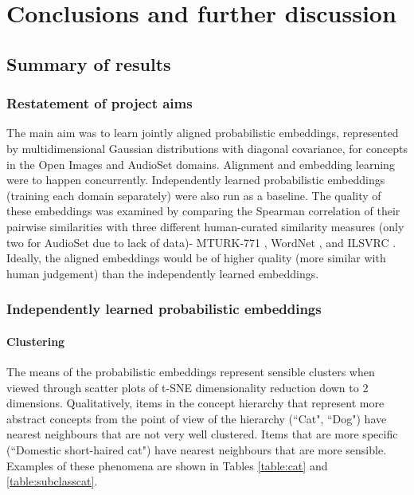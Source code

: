 \chapter{Conclusions and further discussion}

\section{Summary of results}

\subsection{Restatement of project aims}

The main aim was to learn jointly aligned probabilistic embeddings, represented by multidimensional Gaussian distributions with diagonal covariance, for concepts in the Open Images and AudioSet domains. Alignment and embedding learning were to happen concurrently. Independently learned probabilistic embeddings (training each domain separately) were also run as a baseline. The quality of these embeddings was examined by comparing the Spearman correlation of their pairwise similarities with three different human-curated similarity measures (only two for AudioSet due to lack of data)- MTURK-771 \cite{mturk771}, WordNet \cite{WordNet}, and ILSVRC \cite{RoadsLoveCVPR}. Ideally, the aligned embeddings would be of higher quality (more similar with human judgement) than the independently learned embeddings. 

\subsection{Independently learned probabilistic embeddings}

\subsubsection{Clustering}
The means of the probabilistic embeddings represent sensible clusters when viewed through scatter plots of t-SNE dimensionality reduction down to 2 dimensions. Qualitatively, items in the concept hierarchy that represent more abstract concepts from the point of view of the hierarchy (``Cat", ``Dog") have nearest neighbours that are not very well clustered. Items that are more specific (``Domestic short-haired cat")  have nearest neighbours that are more sensible. Examples of these phenomena are shown in Tables \ref{table:cat} and \ref{table:subclasscat}. 

